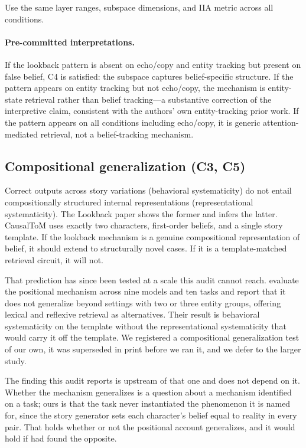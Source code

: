 \documentclass{article}
\begin{document}
Use the same layer ranges, subspace dimensions, and IIA metric across all conditions.

\paragraph{Pre-committed interpretations.} If the lookback pattern is absent on echo/copy and entity tracking but present on false belief, C4 is satisfied: the subspace captures belief-specific structure. If the pattern appears on entity tracking but not echo/copy, the mechanism is entity-state retrieval rather than belief tracking---a substantive correction of the interpretive claim, consistent with the authors' own entity-tracking prior work. If the pattern appears on all conditions including echo/copy, it is generic attention-mediated retrieval, not a belief-tracking mechanism.

\subsection{Compositional generalization (C3, C5)}
\label{sec:composition}

Correct outputs across story variations (behavioral systematicity) do not entail compositionally structured internal representations (representational systematicity). The Lookback paper shows the former and infers the latter. CausalToM uses exactly two characters, first-order beliefs, and a single story template. If the lookback mechanism is a genuine compositional representation of belief, it should extend to structurally novel cases. If it is a template-matched retrieval circuit, it will not.

That prediction has since been tested at a scale this audit cannot reach.
\citet{gurarieh2025mixing} evaluate the positional mechanism across nine models and ten
tasks and report that it does not generalize beyond settings with two or three entity
groups, offering lexical and reflexive retrieval as alternatives. Their result is behavioral
systematicity on the template without the representational systematicity that would carry
it off the template. We registered a compositional generalization test of our own, it was
superseded in print before we ran it, and we defer to the larger study.

The finding this audit reports is upstream of that one and does not depend on it. Whether
the mechanism generalizes is a question about a mechanism identified on a task; ours is that
the task never instantiated the phenomenon it is named for, since the story generator sets
each character's belief equal to reality in every pair. That holds whether or not the
positional account generalizes, and it would hold if \citet{gurarieh2025mixing} had found
the opposite.
\end{document}
